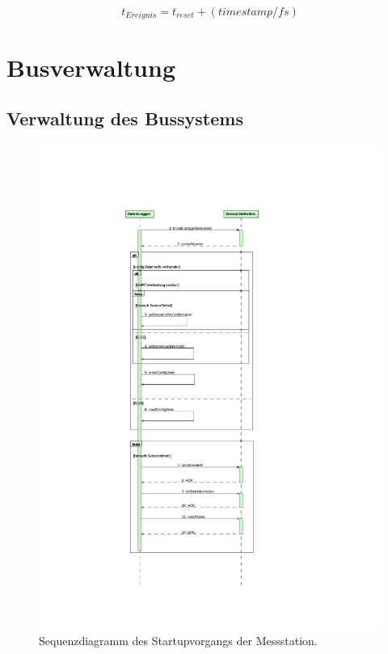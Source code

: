 \begin{equation}\label{eq.timestamp}
t_{Ereignis} = t_{reset} + (timestamp/fs)
\end{equation}

\section{Busverwaltung}

\subsection{Verwaltung des Bussystems}\label{subsec.sw_busverwaltung}


\begin{figure}
	\centering
		\includegraphics[height=0.9\textheight]{images/magicdraw/StartUpSequenz.pdf}
	\caption{Sequenzdiagramm des Startupvorgangs der Messstation.}
	\label{fig.seq_startup}
\end{figure}

